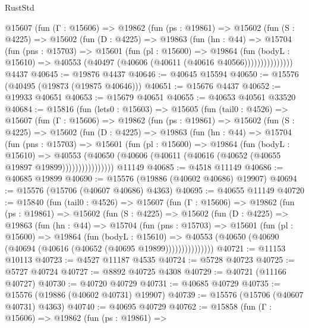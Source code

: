 \begin{lexlean}{RustStd}
\begin{coremodule}
        @15607
          (fun (Γ : @15606) =>
          @19862
            (fun (ps : @19861) =>
            @15602
              (fun (S : @4225) =>
              @15602
                (fun (D : @4225) =>
                @19863
                  (fun (hn : @44) =>
                  @15704
                    (fun (pns : @15703) =>
                    @15601
                      (fun (pl : @15600) =>
                      @19864
                        (fun (bodyL : @15610) =>
                        @40553 (@40497 (@40606 (@40611 (@40616 @40566)))))))))))))))
    @4437
@40645 := @19876 @4437
@40646 := @40645 @15594
@40650 := @15576 (@40495 (@19873 (@19875 @40646)))
@40651 := @15676 @4437
@40652 := @19933 @40651
@40653 := @15679 @40651
@40655 := @40653 @40561 @33520
@40684 := @15816
    (fun (lets0 : @15603) =>
    @15605
      (fun (tail0 : @4526) =>
      @15607
        (fun (Γ : @15606) =>
        @19862
          (fun (ps : @19861) =>
          @15602
            (fun (S : @4225) =>
            @15602
              (fun (D : @4225) =>
              @19863
                (fun (hn : @44) =>
                @15704
                  (fun (pns : @15703) =>
                  @15601
                    (fun (pl : @15600) =>
                    @19864
                      (fun (bodyL : @15610) =>
                      @40553
                        (@40650
                          (@40606 (@40611 (@40616 (@40652 (@40655 @19897 @19899))))))))))))))))
    @11149
@40685 := @4518 @11149
@40686 := @40685 @19899
@40690 := @15576 (@19886 (@40602 @40686) @19907)
@40694 := @15576 (@15706 (@40607 @40686) @4363)
@40695 := @40655 @11149
@40720 := @15840
    (fun (tail0 : @4526) =>
    @15607
      (fun (Γ : @15606) =>
      @19862
        (fun (ps : @19861) =>
        @15602
          (fun (S : @4225) =>
          @15602
            (fun (D : @4225) =>
            @19863
              (fun (hn : @44) =>
              @15704
                (fun (pns : @15703) =>
                @15601
                  (fun (pl : @15600) =>
                  @19864
                    (fun (bodyL : @15610) =>
                    @40553 (@40650 (@40690 (@40694 (@40616 (@40652 (@40695 @19899)))))))))))))))
@40721 := @11153 @10113
@40723 := @4527 @11187 @4535
@40724 := @5728 @40723
@40725 := @5727 @40724
@40727 := @8892 @40725 @4308
@40729 := @40721 (@11166 @40727)
@40730 := @40720 @40729
@40731 := @40685 @40729
@40735 := @15576 (@19886 (@40602 @40731) @19907)
@40739 := @15576 (@15706 (@40607 @40731) @4363)
@40740 := @40695 @40729
@40762 := @15858
    (fun (Γ : @15606) =>
    @19862
      (fun (ps : @19861) =>

\end{coremodule}
\end{lexlean}
